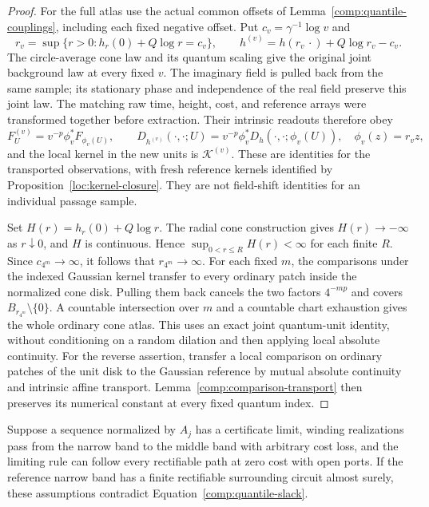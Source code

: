 \begin{proof}
For the full atlas use the actual common offsets of
Lemma~\ref{comp:quantile-couplings}, including each fixed negative
offset.  Put $c_v=\gamma^{-1}\log v$ and
\[
 r_v=\sup\{r>0:h_r(0)+Q\log r=c_v\},\qquad
 h^{(v)}=h(r_v\,\cdot)+Q\log r_v-c_v.
\]
The circle-average cone law and its quantum scaling
\cite[Proposition~4.13(i)]{DMS} give the original joint background law
at every fixed $v$.  The imaginary field is pulled back from the same
sample; its stationary phase and independence of the real field
preserve this joint law.  The matching raw time, height, cost, and
reference arrays were transformed together before extraction.  Their
intrinsic readouts therefore obey
\[
 F^{(v)}_{U}=v^{-p}\phi_v^*F_{\phi_v(U)},\qquad
 D_{h^{(v)}}(\cdot,\cdot;U)
       =v^{-p}\phi_v^*D_h(\cdot,\cdot;\phi_v(U)),
 \quad \phi_v(z)=r_vz,
\]
and the local kernel in the new units is $\mathcal K^{(v)}$.
These are identities for the transported observations, with fresh
reference kernels identified by Proposition~\ref{loc:kernel-closure}.
They are not field-shift identities for an individual passage sample.

Set $H(r)=h_r(0)+Q\log r$.  The radial cone construction gives
$H(r)\to-\infty$ as $r\downarrow0$, and $H$ is continuous.
Hence $\sup_{0<r\le R}H(r)<\infty$ for each finite $R$.
Since $c_{4^m}\to\infty$, it follows that $r_{4^m}\to\infty$.
For each fixed $m$, the comparisons under the indexed Gaussian kernel
transfer to every ordinary patch inside the normalized cone disk.
Pulling them back cancels the two factors $4^{-mp}$ and covers
$B_{r_{4^m}}\setminus\{0\}$.  A countable intersection over $m$
and a countable chart exhaustion gives the whole ordinary cone atlas.
This uses an exact joint quantum-unit identity, without conditioning
on a random dilation and then applying local absolute continuity.
For the reverse assertion, transfer a local comparison on ordinary
patches of the unit disk to the Gaussian reference by mutual absolute
continuity and intrinsic affine transport.  Lemma~\ref{comp:comparison-transport}
then preserves its numerical constant at every fixed quantum index.
\end{proof}

\begin{lemma}
\label{comp:quantile-noncollapse}
Suppose a sequence normalized by $A_j$ has a certificate limit, winding
realizations pass from the narrow band to the middle band with arbitrary
cost loss, and the limiting rule can follow every rectifiable path at
zero cost with open ports.  If the reference narrow band has a finite
rectifiable surrounding circuit almost surely, these assumptions
contradict Equation~\eqref{comp:quantile-slack}.
\end{lemma}

